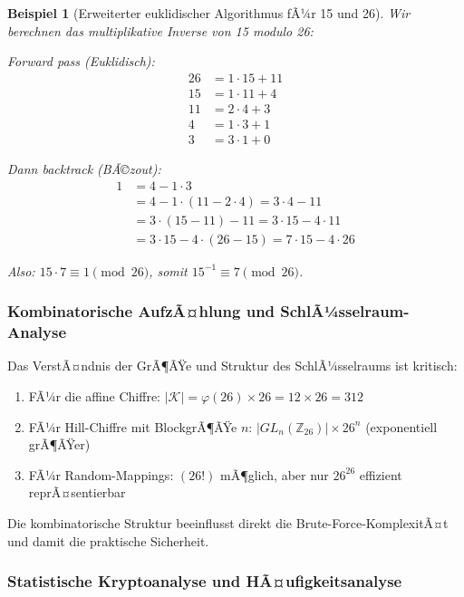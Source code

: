 ﻿\documentclass[12pt,a4paper]{article}
\newtheorem{example}{Beispiel}
\begin{document}
	\begin{example}[Erweiterter euklidischer Algorithmus fÃ¼r 15 und 26]
		Wir berechnen das multiplikative Inverse von 15 modulo 26:
		
		Forward pass (Euklidisch):
		\begin{align}
			26 &= 1 \cdot 15 + 11 \\
			15 &= 1 \cdot 11 + 4 \\
			11 &= 2 \cdot 4 + 3 \\
			4 &= 1 \cdot 3 + 1 \\
			3 &= 3 \cdot 1 + 0
		\end{align}
		
		Dann backtrack (BÃ©zout):
		\begin{align}
			1 &= 4 - 1 \cdot 3 \\
			&= 4 - 1 \cdot (11 - 2 \cdot 4) = 3 \cdot 4 - 11 \\
			&= 3 \cdot (15 - 11) - 11 = 3 \cdot 15 - 4 \cdot 11 \\
			&= 3 \cdot 15 - 4 \cdot (26 - 15) = 7 \cdot 15 - 4 \cdot 26
		\end{align}
		
		Also: $15 \cdot 7 \equiv 1 \pmod{26}$, somit $15^{-1} \equiv 7 \pmod{26}$.
	\end{example}
	
	\subsubsection{Kombinatorische AufzÃ¤hlung und SchlÃ¼sselraum-Analyse}
	
	Das VerstÃ¤ndnis der GrÃ¶ÃŸe und Struktur des SchlÃ¼sselraums ist kritisch:
	\begin{enumerate}
		\item FÃ¼r die affine Chiffre: $|\mathcal{K}| = \varphi(26) \times 26 = 12 \times 26 = 312$
		\item FÃ¼r Hill-Chiffre mit BlockgrÃ¶ÃŸe $n$: $|GL_n(\mathbb{Z}_{26})| \times 26^n$ (exponentiell grÃ¶ÃŸer)
		\item FÃ¼r Random-Mappings: $(26!)$ mÃ¶glich, aber nur $26^{26}$ effizient reprÃ¤sentierbar
	\end{enumerate}
	
	Die kombinatorische Struktur beeinflusst direkt die Brute-Force-KomplexitÃ¤t und damit die praktische Sicherheit.
	
	\subsubsection{Statistische Kryptoanalyse und HÃ¤ufigkeitsanalyse}
	
\end{document}
